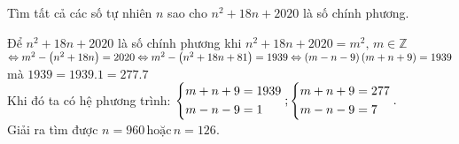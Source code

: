 \begin{ex}%
    Tìm tất cả các số tự nhiên $n$ sao cho $n^2+18n+2020$ là số chính phương.
    
\loigiai
    {Để $ n^2 + 18n + 2020 $ là số chính phương khi $ n^2 + 18n + 2020 = m^2, \, m \in \mathbb{Z} $\\
$     	\Leftrightarrow m^2 - \left(n^2 + 18n\right) = 2020 	\Leftrightarrow m^2 - \left(n^2 + 18n + 81\right) = 1939 \\
	\Leftrightarrow \left(m - n - 9\right)\left(m + n + 9\right) = 1939 $ mà $ 1939 = 1939.1 = 277.7 $\\
	Khi đó ta có hệ phương trình: $\left\{\begin{aligned}m + n + 9 &= 1939\\
	m - n - 9 &= 1 \end{aligned}\right. ; \left\{\begin{aligned}m + n + 9 &= 277\\
	m - n - 9 &= 7 \end{aligned}\right..$ \\
 Giải ra tìm được $ n = 960 \, \text{hoặc} \, n = 126. $
    }
\end{ex}

